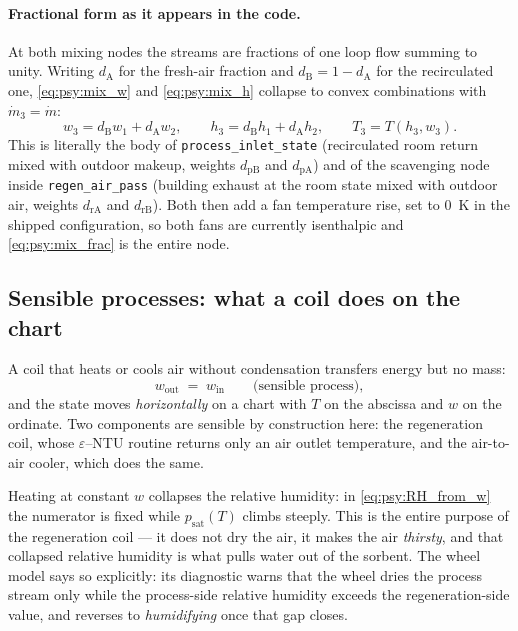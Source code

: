 \documentclass[11pt]{article}
\newcommand{\md}{\ensuremath{\dot m}}
\newcommand{\psat}{\ensuremath{p_{\mathrm{sat}}}}
\begin{document}
\paragraph{Fractional form as it appears in the code.}
At both mixing nodes the streams are fractions of one loop flow summing to unity. Writing
$d_{\mathrm{A}}$ for the fresh-air fraction and $d_{\mathrm{B}} = 1 - d_{\mathrm{A}}$ for the
recirculated one, \eqref{eq:psy:mix_w} and \eqref{eq:psy:mix_h} collapse to convex combinations with
$\md_3 = \md$:
\begin{equation}
w_3 = d_{\mathrm{B}} w_1 + d_{\mathrm{A}} w_2 , \qquad
h_3 = d_{\mathrm{B}} h_1 + d_{\mathrm{A}} h_2 , \qquad T_3 = T(h_3, w_3) . \label{eq:psy:mix_frac}
\end{equation}
This is literally the body of \texttt{process\_inlet\_state} (recirculated room return mixed with
outdoor makeup, weights $d_{\mathrm{pB}}$ and $d_{\mathrm{pA}}$) and of the scavenging node inside
\texttt{regen\_air\_pass} (building exhaust at the room state mixed with outdoor air, weights
$d_{\mathrm{rA}}$ and $d_{\mathrm{rB}}$). Both then add a fan temperature rise, set to
\SI{0}{\kelvin} in the shipped configuration, so both fans are currently isenthalpic and
\eqref{eq:psy:mix_frac} is the entire node.

\subsection{Sensible processes: what a coil does on the chart}
\label{sec:psy:sensible}

A coil that heats or cools air without condensation transfers energy but no mass:
\begin{equation}
w_{\mathrm{out}} \;=\; w_{\mathrm{in}} \qquad \text{(sensible process)} , \label{eq:psy:sensible}
\end{equation}
and the state moves \emph{horizontally} on a chart with $T$ on the abscissa and $w$ on the ordinate.
Two components are sensible by construction here: the regeneration coil, whose $\varepsilon$--NTU
routine returns only an air outlet temperature, and the air-to-air cooler, which does the same.

Heating at constant $w$ collapses the relative humidity: in \eqref{eq:psy:RH_from_w} the numerator
is fixed while $\psat(T)$ climbs steeply. This is the entire purpose of the regeneration coil --- it
does not dry the air, it makes the air \emph{thirsty}, and that collapsed relative humidity is what
pulls water out of the sorbent. The wheel model says so explicitly: its diagnostic warns that the
wheel dries the process stream only while the process-side relative humidity exceeds the
regeneration-side value, and reverses to \emph{humidifying} once that gap closes.
\end{document}
